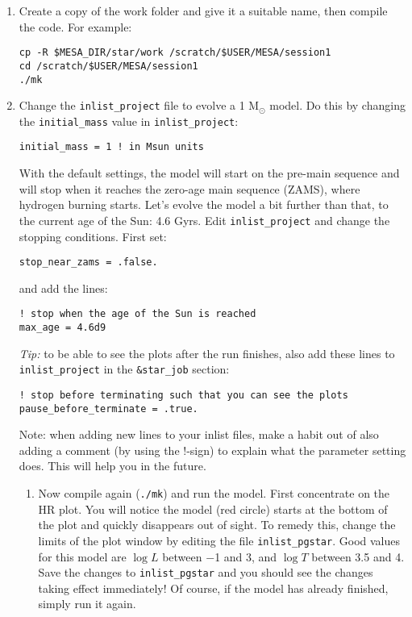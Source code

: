 \documentclass[11pt,a4paper]{article}
\begin{document}
\begin{enumerate}

\item Create a copy of the work folder and give it a suitable name, then compile the code. For example:
\begin{lstlisting}
cp -R $MESA_DIR/star/work /scratch/$USER/MESA/session1
cd /scratch/$USER/MESA/session1
./mk
\end{lstlisting}

\item Change the \verb|inlist_project| file to evolve a 1 M$_\odot$ model. Do this by changing the \texttt{initial\_mass} value in \verb|inlist_project|:
\begin{lstlisting}
initial_mass = 1 ! in Msun units
\end{lstlisting}
With the default settings, the model will start on the pre-main sequence and will stop when it reaches the zero-age main sequence (ZAMS), where hydrogen burning starts. Let's evolve the model a bit further than that, to the current age of the Sun: 4.6 Gyrs. Edit \verb|inlist_project| and change the stopping conditions. First set:
\begin{lstlisting}
stop_near_zams = .false.
\end{lstlisting}
and add the lines:
\begin{lstlisting}
! stop when the age of the Sun is reached
max_age = 4.6d9
\end{lstlisting}
\textit{Tip:} to be able to see the plots after the run finishes, also add these lines to \verb|inlist_project| in the \verb|&star_job| section:
\begin{lstlisting}
! stop before terminating such that you can see the plots
pause_before_terminate = .true.
\end{lstlisting}
Note: when adding new lines to your inlist files, make a habit out of also adding a comment (by using the !-sign) to explain what the parameter setting does. This will help you in the future.
\begin{enumerate}
\item Now compile again (\verb|./mk|) and run the model. First concentrate on the HR plot. You will notice the model (red circle) starts at the bottom of the plot and quickly disappears out of sight. To remedy this, change the limits of the plot window by editing the file \verb|inlist_pgstar|. Good values for this model are $\log L$ between $-$1 and 3, and $\log T$ between 3.5 and 4. Save the changes to \verb|inlist_pgstar| and you should see the changes taking effect immediately! Of course, if the model has already finished, simply run it again. \\[1ex]

\end{enumerate}
\end{enumerate}
\end{document}
